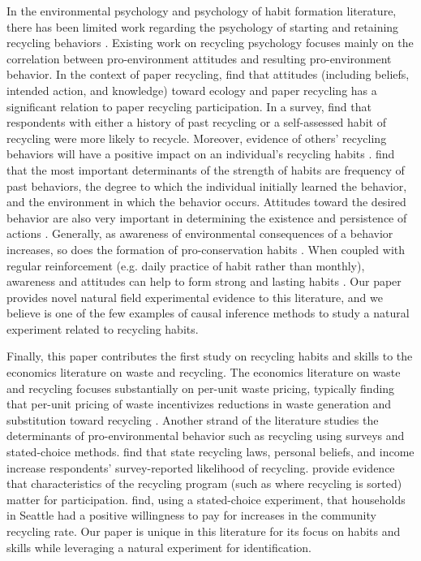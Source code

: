 \documentclass[12pt]{article}
\begin{document}
In the environmental psychology and psychology of habit formation literature, there has been limited work regarding the psychology of starting and retaining recycling behaviors \citep{nordlund2011}. Existing work on recycling psychology focuses mainly on the correlation between pro-environment attitudes and resulting pro-environment behavior.  In the context of paper recycling, \cite{mcguinness1977attitudinal} find that attitudes (including beliefs, intended action, and knowledge) toward ecology and paper recycling has a significant relation to paper recycling participation.  In a survey, \cite{knussenyule2008} find that respondents with either a history of past recycling or a self-assessed habit of recycling were more likely to recycle. Moreover, evidence of others’ recycling behaviors will have a positive impact on an individual’s recycling habits \citep{topf2023follow}. \cite{ouellette1998habit} find that the most important determinants of the strength of habits are frequency of past behaviors, the degree to which the individual initially learned the behavior, and the environment in which the behavior occurs. Attitudes toward the desired behavior are also very important in determining the existence and persistence of actions \citep{ouellette1998habit}. Generally, as awareness of environmental consequences of a behavior increases, so does the formation of pro-conservation habits \citep{gregory2003repeated}. When coupled with regular reinforcement (e.g. daily practice of habit rather than monthly), awareness and attitudes can help to form strong and lasting habits \citep{gregory2003repeated}.  Our paper provides novel natural field experimental evidence to this literature, and we believe is one of the few examples of causal inference methods to study a natural experiment related to recycling habits.

Finally, this paper contributes the first study on recycling habits and skills to the economics literature on waste and recycling.  The economics literature on waste and recycling focuses substantially on per-unit waste pricing, typically finding that per-unit pricing of waste incentivizes reductions in waste generation and substitution toward recycling \citep{fullertonkinnaman1996,fullertonkinnaman2000,usuitakeuchi2014,carattini2018,wright_halstead_huang_2019,buenovalente2020}.  Another strand of the literature studies the determinants of pro-environmental behavior such as recycling using surveys and stated-choice methods.  \cite{viscusihuberbell2011} find that state recycling laws, personal beliefs, and income increase respondents' survey-reported likelihood of recycling. \cite{czajkowskietal2017} provide evidence that characteristics of the recycling program (such as where recycling is sorted) matter for participation.  \cite{kipperberglarson2012} find, using a stated-choice experiment, that households in Seattle had a positive willingness to pay for increases in the community recycling rate.  Our paper is unique in this literature for its focus on habits and skills while leveraging a natural experiment for identification.
\end{document}
